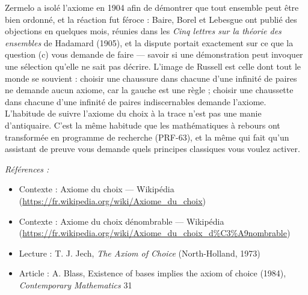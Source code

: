 \documentclass[11pt]{article}
\newenvironment{refs}{\par\small\noindent\emph{Références :}\begin{itemize}\setlength\itemsep{0pt}}{\end{itemize}\normalsize}
\begin{document}
\noindent Zermelo a isolé l'axiome en 1904 afin de démontrer que tout ensemble peut
être bien ordonné, et la réaction fut féroce : Baire, Borel et Lebesgue ont publié des
objections en quelques mois, réunies dans les \textit{Cinq lettres sur la théorie des ensembles}
de Hadamard (1905), et la dispute portait exactement sur ce que la question (c) vous demande
de faire --- savoir si une démonstration peut invoquer une sélection qu'elle ne sait pas
décrire. L'image de Russell est celle dont tout le monde se souvient : choisir une chaussure
dans chacune d'une infinité de paires ne demande aucun axiome, car \og{} la gauche \fg{} est une
règle ; choisir une chaussette dans chacune d'une infinité de paires indiscernables demande
l'axiome. L'habitude de suivre l'axiome du choix à la trace n'est pas une manie d'antiquaire.
C'est la même habitude que les mathématiques à rebours ont transformée en programme de
recherche (PRF-63), et la même qui fait qu'un assistant de preuve vous demande quels
principes classiques vous voulez activer.

\begin{refs}
\item Contexte : Axiome du choix --- Wikipédia (\url{https://fr.wikipedia.org/wiki/Axiome_du_choix})
\item Contexte : Axiome du choix dénombrable --- Wikipédia (\url{https://fr.wikipedia.org/wiki/Axiome_du_choix_d%C3%A9nombrable})
\item Lecture : T. J. Jech, \textit{The Axiom of Choice} (North-Holland, 1973)
\item Article : A. Blass, \og{} Existence of bases implies the axiom of choice \fg{} (1984), \textit{Contemporary Mathematics} 31
\end{refs}

\bigskip
\end{document}
